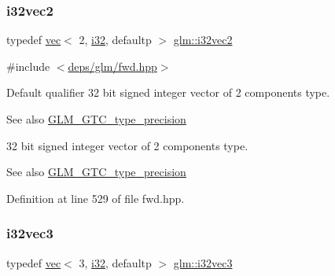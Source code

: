 \mbox{\label{group__gtc__type__precision_ga99191e0de942ecc1df32d522f8064789}} 
\subsubsection{\texorpdfstring{i32vec2}{i32vec2}}
{\footnotesize\ttfamily typedef \hyperlink{structglm_1_1vec}{vec}$<$ 2, \hyperlink{group__gtc__type__precision_ga1d8ed5c43e91ea7d4528389da4fa9524}{i32}, defaultp $>$ \hyperlink{group__gtc__type__precision_ga99191e0de942ecc1df32d522f8064789}{glm\+::i32vec2}}



{\ttfamily \#include $<$\hyperlink{fwd_8hpp}{deps/glm/fwd.\+hpp}$>$}

Default qualifier 32 bit signed integer vector of 2 components type. \begin{DoxySeeAlso}{See also}
\hyperlink{group__gtc__type__precision}{G\+L\+M\+\_\+\+G\+T\+C\+\_\+type\+\_\+precision}
\end{DoxySeeAlso}
32 bit signed integer vector of 2 components type. \begin{DoxySeeAlso}{See also}
\hyperlink{group__gtc__type__precision}{G\+L\+M\+\_\+\+G\+T\+C\+\_\+type\+\_\+precision} 
\end{DoxySeeAlso}


Definition at line 529 of file fwd.\+hpp.

\mbox{\label{group__gtc__type__precision_ga9811a4ec26e517ea85c785d3f3f4baac}} 
\subsubsection{\texorpdfstring{i32vec3}{i32vec3}}
{\footnotesize\ttfamily typedef \hyperlink{structglm_1_1vec}{vec}$<$ 3, \hyperlink{group__gtc__type__precision_ga1d8ed5c43e91ea7d4528389da4fa9524}{i32}, defaultp $>$ \hyperlink{group__gtc__type__precision_ga9811a4ec26e517ea85c785d3f3f4baac}{glm\+::i32vec3}}



